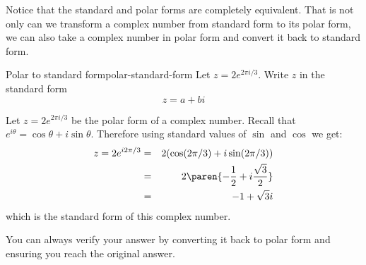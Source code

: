 Notice that the standard and polar forms are completely equivalent. That is not only can we transform a complex number from standard form
to its polar form, we can also take a complex number in polar form and
convert it back to standard form.

\begin{example}{Polar to standard form}{polar-standard-form}
Let $z = 2 e^{ 2\pi i/3}$. Write $z$ in the standard form 
\begin{equation*}
z = a+bi
\end{equation*}
\end{example}

\begin{solution}
Let $z = 2 e^{2\pi i/3}$ be the polar form of a complex number. Recall that 
$e^{i\theta} = \cos \theta + i \sin \theta$. Therefore using standard values of $\sin$ and $\cos$ we get:
\begin{eqnarray*}
z = 2 e^{i 2\pi/3} &=& 2 (\cos (2\pi/3)+i\sin (2\pi/3))\\
&=& 2 \paren{-\frac{1}{2} + i \frac{\sqrt{3}}{2}} \\
&=&-1 + \sqrt{3}i 
\end{eqnarray*}
which is the standard form of this complex number.
\end{solution}

You can always verify your answer by converting it back to polar form and ensuring you reach the original answer. 
